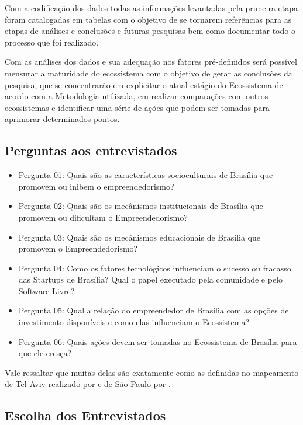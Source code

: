 Com a codificação dos dados todas as informações levantadas pela primeira etapa foram catalogadas em tabelas com o objetivo de se tornarem referências para as etapas de análises e conclusões e futuras pesquisas bem como documentar todo o processo que foi realizado. 

Com as análises dos dados e sua adequação nos fatores pré-definidos será possível mensurar a maturidade do ecossistema com o objetivo de gerar as conclusões da pesquisa, que se concentrarão em explicitar o atual estágio do Ecossistema de acordo com a Metodologia utilizada, em realizar comparações com outros ecossistemas e identificar uma série de ações que podem ser tomadas para aprimorar determinados pontos.

\subsection{Perguntas aos entrevistados}
\label{subsection:questoes_de_pesquisa}

\begin{itemize}
  \item Pergunta 01: Quais são as características socioculturais de Brasília que promovem ou inibem o empreendedorismo?
  \item Pergunta 02: Quais são os mecânismos institucionais de Brasília que promovem ou dificultam o Empreendedorismo?
  \item Pergunta 03: Quais são os mecânismos educacionais de Brasília que promovem o Empreendedorismo?
  \item Pergunta 04: Como os fatores tecnológicos influenciam o sucesso ou fracasso das Startups de Brasília? Qual o papel executado pela comunidade e pelo Software Livre?
  \item Pergunta 05: Qual a relação do empreendedor de Brasília com as opções de investimento disponíveis e como elas influenciam o Ecossistema?
  \item Pergunta 06: Quais ações devem ser tomadas no Ecossistema de Brasília para que ele cresça?
\end{itemize}

Vale ressaltar que muitas delas são exatamente como as definidas no mapeamento de Tel-Aviv realizado por  e de São Paulo por .

\subsection{Escolha dos Entrevistados}
\label{subsection:escolha_dos_entrevistados}


